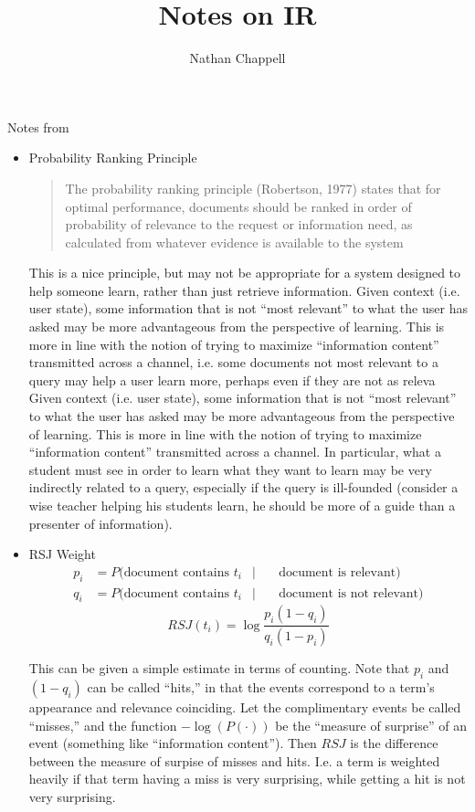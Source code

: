 \documentclass{article}
\title{Notes on IR}
\author{Nathan Chappell}
\begin{document}
\maketitle

Notes from \cite{robertson04}

\begin{itemize}
\item Probability Ranking Principle
    \begin{quote}
    The probability ranking principle (Robertson, 1977) states that for optimal performance, documents should be ranked in order of probability of relevance to the request or information need, as calculated from whatever evidence is available to the system
    \end{quote}

    This is a nice principle, but may not be appropriate for a system designed to help someone learn, rather than just retrieve information.  Given context (i.e. user state), some information that is not ``most relevant'' to what the user has asked may be more advantageous from the perspective of learning.  This is more in line with the notion of trying to maximize ``information content'' transmitted across a channel, i.e. some documents not most relevant to a query may help a user learn more, perhaps even if they are not as releva Given context (i.e. user state), some information that is not ``most relevant'' to what the user has asked may be more advantageous from the perspective of learning.  This is more in line with the notion of trying to maximize ``information content'' transmitted across a channel.  In particular, what a student must see in order to learn what they want to learn may be very indirectly related to a query, especially if the query is ill-founded (consider a wise teacher helping his students learn, he should be more of a guide than a presenter of information).

\item RSJ Weight
    \begin{align*}
    p_i & =  P(\text{document contains } t_i \!&|&\quad \text{document is relevant}) \\
    q_i & =  P(\text{document contains } t_i \!&|&\quad \text{document is not relevant})
    \end{align*}
    \[ RSJ(t_i) = \log\frac{p_i(1-q_i)}{q_i(1-p_i)} \]

    This can be given a simple estimate in terms of counting.  Note that $p_i$ and $(1-q_i)$ can be called ``hits,'' in that the events correspond to a term's appearance and relevance coinciding.  Let the complimentary events be called ``misses,'' and the function $-\log(P(\cdot))$ be the ``measure of surprise'' of an event (something like ``information content'').  Then $RSJ$ is the difference between the measure of surpise of misses and hits.  I.e. a term is weighted heavily if that term having a miss is very surprising, while getting a hit is not very surprising.


\end{itemize}
\end{document}
